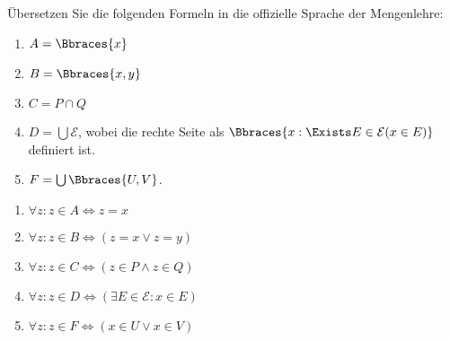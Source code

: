 
\begin{exercise}[14]

Übersetzen Sie die folgenden Formeln in die offizielle Sprache der Mengenlehre:

\begin{enumerate}[label = \alph*.]
    \item $A = \Bbraces{x}$
    \item $B = \Bbraces{x, y}$
    \item $C = P \cap Q$
    \item $D = \bigcup \mathcal{E}$, wobei die rechte Seite als $\Bbraces{x: \Exists E \in \mathcal{E}(x \in E)}$ definiert ist.
    \item $F = \bigcup \Bbraces{U, V}$.
\end{enumerate}

\end{exercise}


\begin{solution}
\phantom{}
\begin{enumerate}[label = \alph*.]
    \item $\forall z: z \in A \iff z = x$
    \item $\forall z: z \in B \iff (z = x \lor z = y)$
    \item $\forall z: z \in C \iff (z \in P \land z \in Q)$
    \item $\forall z: z \in D \iff (\exists E \in \mathcal{E}: x \in E)$
    \item $\forall z: z \in F \iff (x \in U \lor x \in V)$
\end{enumerate}
\end{solution}

